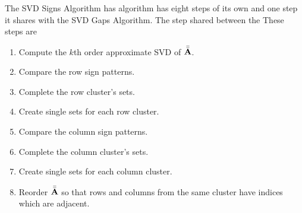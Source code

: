 \documentclass[../../ClusteringConnectionsMAIN.tex]{subfiles}
\begin{document}
\begin{flushleft}
\begin{large}


The SVD Signs Algorithm has algorithm has eight steps of its own and one step it shares with the SVD Gaps Algorithm.  The step shared between the   These steps are

\begin{enumerate}
\item Compute the $k$th order approximate SVD of $\bar{\bar{\mathbf{A}}}$.
\item Compare the row sign patterns.
\item Complete the row cluster's sets.
\item Create single sets for each row cluster.
\item Compare the column sign patterns.
\item Complete the column cluster's sets.
\item Create single sets for each column cluster.
\item Reorder $\bar{\bar{\mathbf{A}}}$ so that rows and columns from the same cluster have indices which are adjacent.
\end{enumerate}


\end{large}
\end{flushleft}
\end{document}
